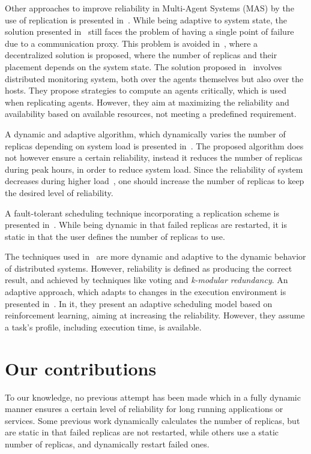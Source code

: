 \documentclass{cslthse-msc}
\begin{document}
Other approaches to improve reliability in Multi-Agent Systems (MAS) by the use of replication is presented in~\cite{replicatingAgents, adaptiveMASReplication, adaptiveAgentReplication}. While being adaptive to system state, the solution presented in~\cite{replicatingAgents} still faces the problem of having a single point of failure due to a communication proxy. This problem is avoided in~\cite{adaptiveMASReplication}, where a decentralized solution is proposed, where the number of replicas and their placement depends on the system state. %
The solution proposed in~\cite{adaptiveAgentReplication} involves distributed monitoring system, both over the agents themselves but also over the hosts. They propose strategies to compute an agents critically, which is used when replicating agents. However, they aim at maximizing the reliability and availability based on available resources, not meeting a predefined requirement. %

A dynamic and adaptive algorithm, which dynamically varies the number of replicas depending on system load is presented in~\cite{adaptiveCheckPointAndRep}. The proposed algorithm does not however ensure a certain reliability, instead it reduces the number of replicas during peak hours, in order to reduce system load. Since the reliability of system decreases during higher load~\cite{studyOfFailures, implicationsOfFailures}, one should increase the number of replicas to keep the desired level of reliability.

A fault-tolerant scheduling technique incorporating a replication scheme is presented in~\cite{faultTolerantSchedPolicy}. While being dynamic in that failed replicas are restarted, it is static in that the user defines the number of replicas to use.

The techniques used in~\cite{selfAdaptRel, dynAdaptRepl, relModelWebServices} are more dynamic and adaptive to the dynamic behavior of distributed systems. However, reliability is defined as producing the correct result, and achieved by techniques like voting and \emph{k-modular redundancy}.
An adaptive approach, which adapts to changes in the execution environment is presented in~\cite{imprRelAdaptRL}. In it, they present an adaptive scheduling model based on reinforcement learning, aiming at increasing the reliability. However, they assume a task's profile, including execution time, is available.


\section{Our contributions} \label{sec:introduction_contributions}
To our knowledge, no previous attempt has been made which in a fully dynamic manner ensures a certain level of reliability for long running applications or services. Some previous work dynamically calculates the number of replicas, but are static in that failed replicas are not restarted, while others use a static number of replicas, and dynamically restart failed ones.
\end{document}
